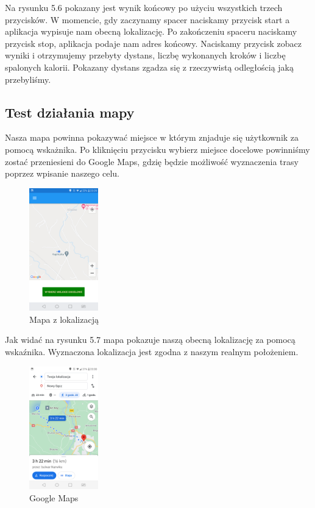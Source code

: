 Na rysunku 5.6 pokazany jest wynik końcowy po użyciu wszystkich trzech przycisków. W momencie, gdy zaczynamy spacer naciskamy przycisk start a aplikacja wypisuje nam obecną lokalizację. Po zakończeniu spaceru naciskamy przycisk stop, aplikacja podaje nam adres końcowy. Naciskamy przycisk zobacz wyniki i otrzymujemy przebyty dystans, liczbę wykonanych kroków i liczbę spalonych kalorii. Pokazany dystans zgadza się z rzeczywistą odległością jaką przebyliśmy.

\subsection{Test działania mapy}

\hspace{1cm} Nasza mapa powinna pokazywać miejsce w którym znjaduje się użytkownik za pomocą wskażnika. Po kliknięciu przycisku wybierz miejsce docelowe powinniśmy zostać przeniesieni do Google Maps, gdzię będzie możliwość wyznaczenia trasy poprzez wpisanie naszego celu.

\begin{figure}[!htb]
	\begin{center}
		\includegraphics[width=3cm]{rys/ZZmapa.png}
		\caption{Mapa z lokalizacją}
		\label{rys:rysunek035}
	\end{center}
\end{figure} 

Jak widać na rysunku 5.7 mapa pokazuje naszą obecną lokalizację za pomocą wskaźnika. Wyznaczona lokalizacja jest zgodna z naszym realnym położeniem.

\begin{figure}[!htb]
	\begin{center}
		\includegraphics[width=3cm]{rys/ZZgm.png}
		\caption{Google Maps}
		\label{rys:rysunek036}
	\end{center}
\end{figure}

